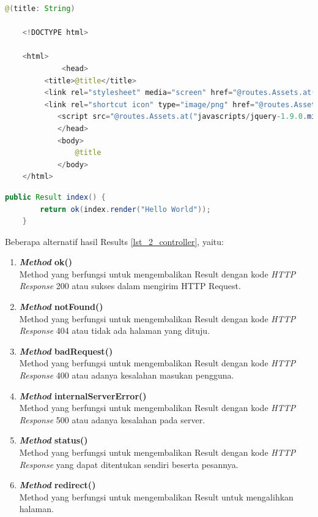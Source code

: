 \begin{lstlisting}[caption=Contoh View (index.scala.html),label = {lst_2_view},language=Java]
@(title: String)

	<!DOCTYPE html>

	<html>
    		 <head>
       	 <title>@title</title>
       	 <link rel="stylesheet" media="screen" href="@routes.Assets.at("stylesheets/main.css")">
       	 <link rel="shortcut icon" type="image/png" href="@routes.Assets.at("images/favicon.png")">
        	<script src="@routes.Assets.at("javascripts/jquery-1.9.0.min.js")" type="text/javascript"></script>
    		</head>
    		<body>
        		@title
    		</body>
	</html>
\end{lstlisting}


\begin{lstlisting}[caption=Contoh Controller,label = {lst_2_controller},language=Java]
	public Result index() {
        return ok(index.render("Hello World"));
    }
\end{lstlisting}

Beberapa alternatif hasil Results \ref{lst_2_controller}, yaitu:
\begin{enumerate}
	\item \textbf{\textit{Method} ok()}\\ 
	Method yang berfungsi untuk mengembalikan Result dengan kode \textit{HTTP Response} 200 atau sukses dalam mengirim HTTP Request.
	\item \textbf{\textit{Method} notFound()}\\
	Method yang berfungsi untuk mengembalikan Result dengan  kode \textit{HTTP Response} 404 atau tidak ada halaman yang dituju.
	\item \textbf{\textit{Method} badRequest()}\\
	Method yang berfungsi untuk mengembalikan Result dengan kode \textit{HTTP Response} 400 atau adanya kesalahan masukan pengguna.
	\item \textbf{\textit{Method} internalServerError()}\\
	Method yang berfungsi untuk mengembalikan Result dengan kode \textit{HTTP Response} 500 atau adanya kesalahan pada server.
	\item \textbf{\textit{Method} status()}\\
	Method yang berfungsi untuk mengembalikan Result dengan kode \textit{HTTP Response} yang dapat ditentukan sendiri beserta pesannya.
	\item \textbf{\textit{Method} redirect()}\\
	Method yang berfungsi untuk mengembalikan Result untuk mengalihkan halaman.
\end{enumerate}

